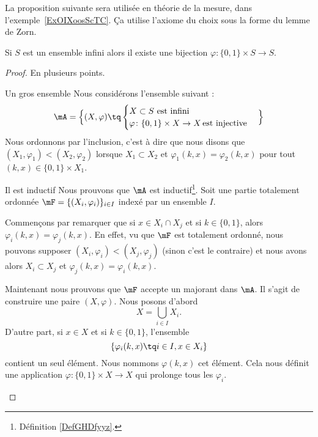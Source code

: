 La proposition suivante sera utilisée en théorie de la mesure, dans l'exemple~\ref{ExOIXoosScTC}. Ça utilise l'axiome du choix sous la forme du lemme de Zorn.
\begin{proposition} \label{PropVCSooMzmIX}
    Si \( S\) est un ensemble infini alors il existe une bijection \( \varphi\colon \{ 0,1 \}\times S\to S\).
\end{proposition}

\begin{proof}
    En plusieurs points.
    \begin{subproof}
        \item[Un gros ensemble]
            Nous considérons l'ensemble suivant :
                \begin{equation}
                   \mA=\Big\{  (X,\varphi)  \tq
                    \begin{cases}
                        X\subset S\text{ est infini}\\
                        \varphi\colon \{ 0,1 \}\times X\to X\,\text{est injective}
                    \end{cases}
                \Big\}
                \end{equation}
                Nous ordonnons par l'inclusion, c'est à dire que nous disons que \( (X_1,\varphi_1)<(X_2,\varphi_2)\) lorsque \( X_1\subset X_2\) et \( \varphi_1(k,x)=\varphi_2(k,x)\) pour tout \( (k,x)\in \{ 0,1 \}\times X_1\).
        \item[Il est inductif]
            Nous prouvons que \( \mA\) est inductif\footnote{Définition \ref{DefGHDfyyz}.}. Soit une partie totalement ordonnée \( \mF=\{ (X_i,\varphi_i) \}_{i\in I}\) indexé par un ensemble \( I\).

            Commençons par remarquer que si \( x\in X_i\cap X_j\) et si \( k\in \{ 0,1 \}\), alors \( \varphi_i(k,x)=\varphi_j(k,x)\). En effet, vu que \( \mF\) est totalement ordonné, nous pouvons supposer \( (X_i,\varphi_i)<(X_j,\varphi_j)\) (sinon c'est le contraire) et nous avons alors \( X_i\subset X_j\) et \( \varphi_j(k,x)=\varphi_i(k,x)\).

            Maintenant nous prouvons que \( \mF\) accepte un majorant dans \( \mA\). Il s'agit de construire une paire \( (X,\varphi)\). Nous posons d'abord
            \begin{equation}
                X=\bigcup_{i\in I}X_i.
            \end{equation}
            D'autre part, si \( x\in X\) et si \( k\in \{ 0,1 \}\), l'ensemble 
            \begin{equation}
             \{ \varphi_i(k, x)\tq i\in I, x\in X_i \}   
            \end{equation}
             contient un seul élément. Nous nommons \( \varphi(k,x)\) cet élément. Cela nous définit une application \( \varphi\colon \{ 0,1 \}\times X\to X \) qui prolonge tous les \( \varphi_i\).


\end{subproof}
\end{proof}
